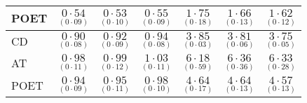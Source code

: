 \documentclass[11pt,oneside]{amsart}
\begin{document}
\begin{table}[htbp!]
\begin{multicols}{7}
\begin{tabular}{|p{1.92cm}|p{1.92cm}|p{1.92cm}|p{1.92cm}|p{1.92cm}|p{1.92cm}|p{1.92cm}|}
POET & ${\underset{(0\cdot09)}{0\cdot54}}$ & ${\underset{(0\cdot10)}{0\cdot53}}$ & ${\underset{(0\cdot09)}{0\cdot55}}$ & ${\underset{(0\cdot18)}{1\cdot75}}$ & ${\underset{(0\cdot13)}{1\cdot66}}$ & ${\underset{(0\cdot12)}{1\cdot62}}$ \\ 
\hline
\hline
CD & ${\underset{(0\cdot08)}{0\cdot90}}$ & ${\underset{(0\cdot09)}{0\cdot92}}$ & ${\underset{(0\cdot08)}{0\cdot94}}$ & ${\underset{(0\cdot03)}{3\cdot85}}$ & ${\underset{(0\cdot06)}{3\cdot81}}$ & ${\underset{(0\cdot05)}{3\cdot75}}$ \\  
AT & ${\underset{(0\cdot11)}{0\cdot98}}$ & ${\underset{(0\cdot12)}{0\cdot99}}$ & ${\underset{(0\cdot11)}{1\cdot03}}$ & ${\underset{(0\cdot59)}{6\cdot18}}$ & ${\underset{(0\cdot36)}{6\cdot36}}$ & ${\underset{(0\cdot28)}{6\cdot33}}$ \\ 
POET & ${\underset{(0\cdot09)}{0\cdot94}}$ & ${\underset{(0\cdot11)}{0\cdot95}}$ & ${\underset{(0\cdot10)}{0\cdot98}}$ & ${\underset{(0\cdot17)}{4\cdot64}}$ & ${\underset{(0\cdot13)}{4\cdot64}}$ & ${\underset{(0\cdot13)}{4\cdot57}}$ \\ 
\hline
\end{tabular}
\end{multicols}
\end{table}
\end{document}
